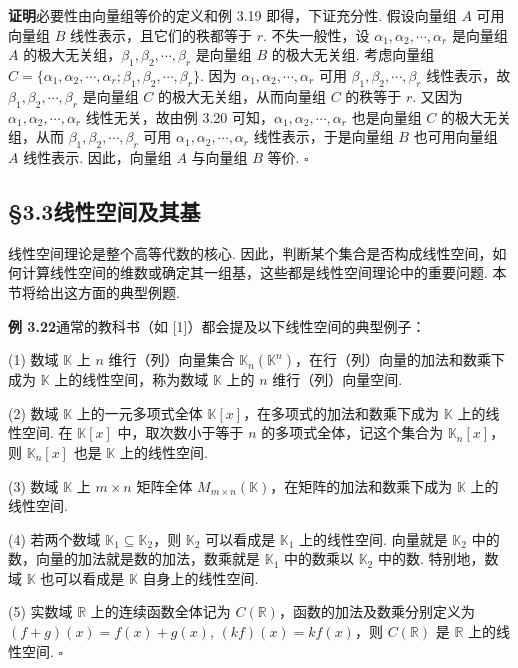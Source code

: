 \documentclass[UTF8, 12pt, fontset=fandol, oneside]{ctexart}
\begin{document}
\noindent\textbf{证明}\quad 必要性由向量组等价的定义和例 3.19 即得，下证充分性. 假设向量组 $A$ 可用向量组 $B$ 线性表示，且它们的秩都等于 $r$. 不失一般性，设 $\alpha_1,\alpha_2,\cdots,\alpha_r$ 是向量组 $A$ 的极大无关组，$\beta_1,\beta_2,\cdots,\beta_r$ 是向量组 $B$ 的极大无关组. 考虑向量组 $C=\{\alpha_1,\alpha_2,\cdots,\alpha_r;\beta_1,\beta_2,\cdots,\beta_r\}$. 因为 $\alpha_1,\alpha_2,\cdots,\alpha_r$ 可用 $\beta_1,\beta_2,\cdots,\beta_r$ 线性表示，故 $\beta_1,\beta_2,\cdots,\beta_r$ 是向量组 $C$ 的极大无关组，从而向量组 $C$ 的秩等于 $r$. 又因为 $\alpha_1,\alpha_2,\cdots,\alpha_r$ 线性无关，故由例 3.20 可知，$\alpha_1,\alpha_2,\cdots,\alpha_r$ 也是向量组 $C$ 的极大无关组，从而 $\beta_1,\beta_2,\cdots,\beta_r$ 可用 $\alpha_1,\alpha_2,\cdots,\alpha_r$ 线性表示，于是向量组 $B$ 也可用向量组 $A$ 线性表示. 因此，向量组 $A$ 与向量组 $B$ 等价. $\square$

\subsection*{§3.3\quad 线性空间及其基}

线性空间理论是整个高等代数的核心. 因此，判断某个集合是否构成线性空间，如何计算线性空间的维数或确定其一组基，这些都是线性空间理论中的重要问题. 本节将给出这方面的典型例题.

\noindent\textbf{例 3.22}\quad 通常的教科书（如 [1]）都会提及以下线性空间的典型例子：

(1) 数域 $\mathbb{K}$ 上 $n$ 维行（列）向量集合 $\mathbb{K}_n(\mathbb{K}^n)$，在行（列）向量的加法和数乘下成为 $\mathbb{K}$ 上的线性空间，称为数域 $\mathbb{K}$ 上的 $n$ 维行（列）向量空间.

(2) 数域 $\mathbb{K}$ 上的一元多项式全体 $\mathbb{K}[x]$，在多项式的加法和数乘下成为 $\mathbb{K}$ 上的线性空间. 在 $\mathbb{K}[x]$ 中，取次数小于等于 $n$ 的多项式全体，记这个集合为 $\mathbb{K}_n[x]$，则 $\mathbb{K}_n[x]$ 也是 $\mathbb{K}$ 上的线性空间.

(3) 数域 $\mathbb{K}$ 上 $m\times n$ 矩阵全体 $M_{m\times n}(\mathbb{K})$，在矩阵的加法和数乘下成为 $\mathbb{K}$ 上的线性空间.

(4) 若两个数域 $\mathbb{K}_1\subseteq\mathbb{K}_2$，则 $\mathbb{K}_2$ 可以看成是 $\mathbb{K}_1$ 上的线性空间. 向量就是 $\mathbb{K}_2$ 中的数，向量的加法就是数的加法，数乘就是 $\mathbb{K}_1$ 中的数乘以 $\mathbb{K}_2$ 中的数. 特别地，数域 $\mathbb{K}$ 也可以看成是 $\mathbb{K}$ 自身上的线性空间.

(5) 实数域 $\mathbb{R}$ 上的连续函数全体记为 $C(\mathbb{R})$，函数的加法及数乘分别定义为 $(f+g)(x)=f(x)+g(x)$, $(kf)(x)=kf(x)$，则 $C(\mathbb{R})$ 是 $\mathbb{R}$ 上的线性空间. $\square$
\end{document}
